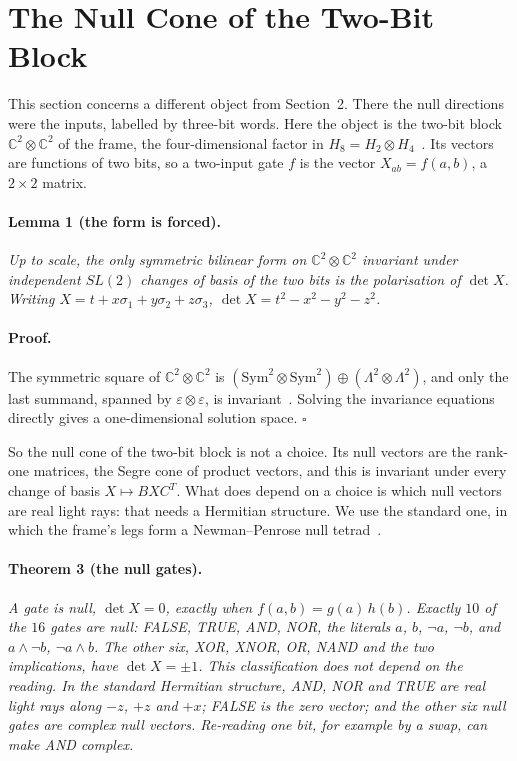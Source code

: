 \documentclass[twocolumn]{iopjournal}
\begin{document}

\section{The Null Cone of the Two-Bit Block}

This section concerns a different object from Section~2. There the
null directions were the inputs, labelled by three-bit words. Here the
object is the two-bit block $\mathbb{C}^2 \otimes \mathbb{C}^2$ of the
frame, the four-dimensional factor in $H_8 = H_2 \otimes
H_4$~\cite{NelsonC}. Its vectors are functions of two bits, so a
two-input gate $f$ is the vector $X_{ab} = f(a,b)$, a $2\times2$
matrix.

\paragraph{Lemma 1 (the form is forced).} \textit{Up to scale, the
only symmetric bilinear form on $\mathbb{C}^2 \otimes \mathbb{C}^2$
invariant under independent $SL(2)$ changes of basis of the two bits is
the polarisation of $\det X$. Writing $X = t + x\sigma_1 + y\sigma_2 +
z\sigma_3$, $\det X = t^2 - x^2 - y^2 - z^2$.}

\paragraph{Proof.} The symmetric square of $\mathbb{C}^2 \otimes
\mathbb{C}^2$ is $(\mathrm{Sym}^2 \otimes \mathrm{Sym}^2) \oplus
(\Lambda^2 \otimes \Lambda^2)$, and only the last summand, spanned by
$\varepsilon \otimes \varepsilon$, is invariant~\cite{PenroseRindler}.
Solving the invariance equations directly gives a one-dimensional
solution space. \hfill $\square$

\medskip
\noindent
So the null cone of the two-bit block is not a choice. Its null vectors
are the rank-one matrices, the Segre cone of product vectors, and this
is invariant under every change of basis $X \mapsto BXC^T$. What does
depend on a choice is which null vectors are real light rays: that
needs a Hermitian structure. We use the standard one, in which the
frame's legs form a Newman--Penrose null tetrad~\cite{NelsonNullRot}.

\paragraph{Theorem 3 (the null gates).} \textit{A gate is null,
$\det X = 0$, exactly when $f(a,b) = g(a)\,h(b)$. Exactly $10$ of the
$16$ gates are null: FALSE, TRUE, AND, NOR, the literals $a$, $b$,
$\neg a$, $\neg b$, and $a\wedge\neg b$, $\neg a \wedge b$. The other
six, XOR, XNOR, OR, NAND and the two implications, have
$\det X = \pm1$. This classification does not depend on the reading. In
the standard Hermitian structure, AND, NOR and TRUE are real light rays
along $-z$, $+z$ and $+x$; FALSE is the zero vector; and the other six
null gates are complex null vectors. Re-reading one bit, for example
by a swap, can make AND complex.}
\end{document}

